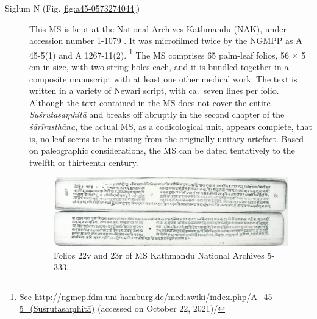 \begin{description}
\item[Siglum N (Fig.\,\ref{fig:a45-0573274044})] This MS is kept at the National Archives 
Kathmandu (NAK), under accession number 1-1079 . It was microfilmed twice by the 
NGMPP as A 45-5(1) and A 1267-11(2).%
    \footnote{%
See 
\url{http://ngmcp.fdm.uni-hamburg.de/mediawiki/index.php/A_45-5_(Suśrutasaṃhitā)}
 (accessed on October 22, 2021)/
    } 
The MS comprises 65 palm-leaf folios, 56 $\times$ 5\,cm in size, with two string holes each, 
and it is bundled together in a composite manuscript with at least one other medical work. 
The text is written in a variety of Newari script, with ca.\ seven lines per folio. Although the 
text contained in the MS does not cover the entire \emph{Suśrutasaṃhitā} and breaks off 
abruptly in the second chapter of the \emph{śārīrasthāna}, the actual MS, as a codicological 
unit, appears complete, that is, no leaf seems to be missing from the originally unitary 
artefact. Based on paleographic considerations, the MS can be dated tentatively to the twelfth 
or thirteenth century.

\begin{figure}[t]
    \centering
    \includegraphics[width=1\linewidth]{"media/dscn2998 fol 022cropped"}
    \caption{Folios 22v and 23r of MS Kathmandu National Archives 5-333.}
    \label{fig:dscn2998-fol-022cropped}
\end{figure}


\end{description}
